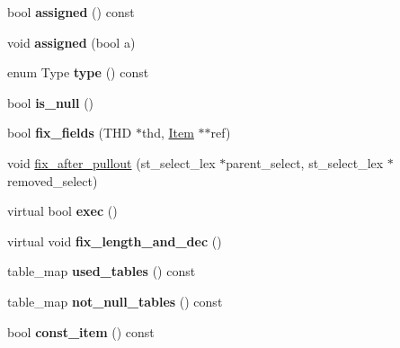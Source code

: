 \begin{DoxyCompactItemize}
bool {\bfseries assigned} () const
\item 
\mbox{\label{classItem__subselect_aaaf5e6c0d77cd3fdde5f38e74b3b2afc}} 
void {\bfseries assigned} (bool a)
\item 
\mbox{\label{classItem__subselect_a4dfac4bd64e20d641bac18cbe55a8bf6}} 
enum Type {\bfseries type} () const
\item 
\mbox{\label{classItem__subselect_acb9e1e59aacf2c14bb6add3b4652e877}} 
bool {\bfseries is\+\_\+null} ()
\item 
\mbox{\label{classItem__subselect_a40f8e8c8f599529db3bd9a3152b2cdcf}} 
bool {\bfseries fix\+\_\+fields} (T\+HD $\ast$thd, \mbox{\hyperlink{classItem}{Item}} $\ast$$\ast$ref)
\item 
void \mbox{\hyperlink{classItem__subselect_a8636b93f943b8a52f75222eb4e49c4cf}{fix\+\_\+after\+\_\+pullout}} (st\+\_\+select\+\_\+lex $\ast$parent\+\_\+select, st\+\_\+select\+\_\+lex $\ast$removed\+\_\+select)
\item 
\mbox{\label{classItem__subselect_af0ae42fa99f0d81fc16e5a5991fbe77a}} 
virtual bool {\bfseries exec} ()
\item 
\mbox{\label{classItem__subselect_a540f884ab9d0aa9c9a780362b1b3705e}} 
virtual void {\bfseries fix\+\_\+length\+\_\+and\+\_\+dec} ()
\item 
\mbox{\label{classItem__subselect_accc65a41c32a8a66d944d2ffad1562b1}} 
table\+\_\+map {\bfseries used\+\_\+tables} () const
\item 
\mbox{\label{classItem__subselect_a641a61f1bc5e616fc669ef13f1babdf4}} 
table\+\_\+map {\bfseries not\+\_\+null\+\_\+tables} () const
\item 
\mbox{\label{classItem__subselect_a641a5947bd768765933be042b4b7135a}} 
bool {\bfseries const\+\_\+item} () const
\item 
\mbox{\label{classItem__subselect_a9fe87ad9bf7c02b1959aae91506d418d}} 
$$
\end{DoxyCompactItemize}
